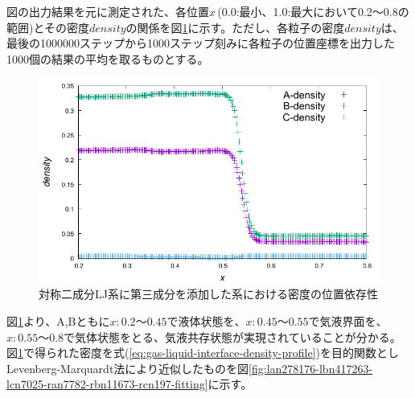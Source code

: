 \documentclass[titlepage]{jsreport}
\begin{document}

図の出力結果を元に測定された、各位置$x$\,(0.0:最小、1.0:最大において0.2〜0.8の範囲)とその密度$density$の関係を図\ref{fig:lan278176-lbn417263-lcn7025-ran7782-rbn11673-rcn197}に示す。ただし、各粒子の密度$density$は、最後の1000000ステップから1000ステップ刻みに各粒子の位置座標を出力した1000個の結果の平均を取るものとする。

\begin{figure}[htbp]
    \begin{center}
        \includegraphics[width=14cm]{fig/lan278176-lbn417263-lcn7025-ran7782-rbn11673-rcn197/lan278176-lbn417263-lcn7025-ran7782-rbn11673-rcn197.pdf}
    \end{center}
    \caption{対称二成分LJ系に第三成分を添加した系における密度の位置依存性}
    \label{fig:lan278176-lbn417263-lcn7025-ran7782-rbn11673-rcn197}
\end{figure}

図\ref{fig:lan278176-lbn417263-lcn7025-ran7782-rbn11673-rcn197}より、A,Bともに$x:0.2〜0.45$で液体状態を、$x:0.45〜0.55$で気液界面を、$x:0.55〜0.8$で気体状態をとる、気液共存状態が実現されていることが分かる。図\ref{fig:lan278176-lbn417263-lcn7025-ran7782-rbn11673-rcn197}で得られた密度を式(\ref{eq:gas-liquid-interface-density-profile})を目的関数としLevenberg-Marquardt法により近似したものを図\ref{fig:lan278176-lbn417263-lcn7025-ran7782-rbn11673-rcn197-fitting}に示す。
\end{document}
